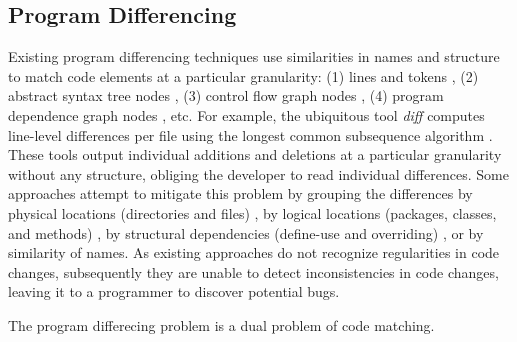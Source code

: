 \documentclass[runningheads,a4paper]{llncs}
\begin{document}
\subsection{Program Differencing} 
Existing program differencing techniques use similarities in names and structure to match code elements at a particular granularity: (1) lines and tokens \cite{Apostolico1997, Hunt1977, Reiss2008, Tichy1984}, (2) abstract syntax tree nodes \cite{Cottrell2007, Fluri2007, Hunt2002, Neamtiu2005, Raghavan2004, Yang1991}, (3) control flow graph nodes \cite{Apiwattanapong2004, Laski1992}, (4) program dependence graph nodes \cite{Binkley1995, Horwitz1990, Jackson1994}, etc.  For example, the ubiquitous tool {\it diff} computes line-level differences per file using the longest common subsequence algorithm \cite{Hunt1977}. These tools output individual additions and deletions at a particular granularity without any structure, obliging the developer to read individual differences. Some approaches attempt to mitigate this problem by grouping the differences by physical locations (directories and files) \cite{Hunt1976}, by logical locations (packages, classes, and methods) \cite{Xing2005}, by structural dependencies (define-use and overriding) \cite{Chesley2005}, or by similarity of names. 
As existing approaches do not recognize regularities in code changes, subsequently they are unable to detect inconsistencies in code changes, leaving it to a programmer to discover potential bugs.  

The program differecing problem is a dual problem of code matching.  
		\label{related_codematching}
\end{document}
